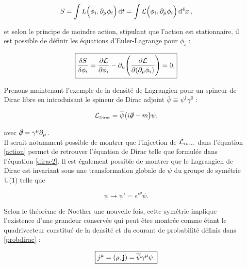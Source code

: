         $$S=\int L\Bigl(\phi_i,\partial_{\mu}\phi_i\Bigr)\dd{t} = \int\mathcal{L}\Bigl(\phi_i,\partial_{\mu}\phi_i\Bigr)\dd[4]{x},$$

        et selon le principe de moindre action, stipulant que l'action est stationnaire, il est possible de définir les équations d'Euler-Lagrange pour $\phi_i$ :

        \begin{equation}
        \boxed{
            \fdv{S}{\phi_i}=\pdv{\mathcal{L}}{\phi_i}-\partial_{\mu}\Biggl(\pdv{\mathcal{L}}{(\partial_{\mu}\phi_i)}\Biggr)=0.
        }
        \label{action}
        \end{equation}

        Prenons maintenant l'exemple de la densité de Lagrangien pour un spineur de Dirac libre en introduisant le spineur de Dirac adjoint $\overline{\psi}\equiv\psi^{\dag}\gamma^0$ :

        \begin{equation}
            \mathcal{L}_{\mbox{\tiny Dirac}}=\overline{\psi}\bigl(i\slashed\partial-m\bigr)\psi,
        \label{Ldirac}
        \end{equation}

        avec $\slashed \partial = \gamma^{\mu}\partial_{\mu}$. \\

        Il serait notamment possible de montrer que l'injection de $\mathcal{L}_{\mbox{\tiny Dirac}}$ dans l'équation \ref{action} permet de retrouver l'équation de Dirac telle que formulée dans l'équation \ref{dirac2}. Il est également possible de montrer que le Lagrangien de Dirac est invariant sous une transformation globale de $\psi$ du groupe de symétrie U($1$) telle que 

        $$\psi\rightarrow\psi'=e^{i\theta}\psi.$$

        Selon le théorème de Noether une nouvelle fois, cette symétrie implique l'existence d'une grandeur conservée qui peut être montrée comme étant le quadrivecteur constitué de la densité et du courant de probabilité définis dans \ref{probdirac} : 

        \begin{equation}
        \boxed{
            j^{\mu}=(\rho,\vb{j})=\overline{\psi}\gamma^{\mu}\psi. 
        }
        \label{fermioncurrent}
        \end{equation}

